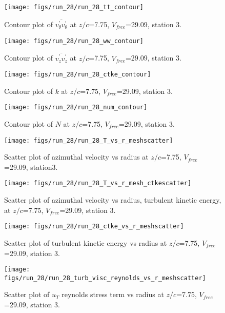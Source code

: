 \begin{figure}[H]
\centering
\texttt{[image: figs/run\_28/run\_28\_tt\_contour]}
\caption{Contour plot of $\overline{v_{\theta}^{\prime} v_{\theta}^{\prime}}$ at $z/c$=7.75, $V_{free}$=29.09, station 3.}
\end{figure}


\begin{figure}[H]
\centering
\texttt{[image: figs/run\_28/run\_28\_ww\_contour]}
\caption{Contour plot of $\overline{v_{z}^{\prime} v_{z}^{\prime}}$ at $z/c$=7.75, $V_{free}$=29.09, station 3.}
\end{figure}


\begin{figure}[H]
\centering
\texttt{[image: figs/run\_28/run\_28\_ctke\_contour]}
\caption{Contour plot of $k$ at $z/c$=7.75, $V_{free}$=29.09, station 3.}
\end{figure}


\begin{figure}[H]
\centering
\texttt{[image: figs/run\_28/run\_28\_num\_contour]}
\caption{Contour plot of $N$ at $z/c$=7.75, $V_{free}$=29.09, station 3.}
\end{figure}


\begin{figure}[H]
\centering
\texttt{[image: figs/run\_28/run\_28\_T\_vs\_r\_meshscatter]}
\caption{Scatter plot of azimuthal velocity vs radius at $z/c$=7.75, $V_{free}$=29.09, station3.}
\end{figure}


\begin{figure}[H]
\centering
\texttt{[image: figs/run\_28/run\_28\_T\_vs\_r\_mesh\_ctkescatter]}
\caption{Scatter plot of azimuthal velocity vs radius, turbulent kinetic energy, at $z/c$=7.75, $V_{free}$=29.09, station 3.}
\end{figure}


\begin{figure}[H]
\centering
\texttt{[image: figs/run\_28/run\_28\_ctke\_vs\_r\_meshscatter]}
\caption{Scatter plot of turbulent kinetic energy vs radius at $z/c$=7.75, $V_{free}$=29.09, station 3.}
\end{figure}


\begin{figure}[H]
\centering
\texttt{[image: figs/run\_28/run\_28\_turb\_visc\_reynolds\_vs\_r\_meshscatter]}
\caption{Scatter plot of $
u_T$ reynolds stress term vs radius at $z/c$=7.75, $V_{free}$=29.09, station 3.}
\end{figure}


